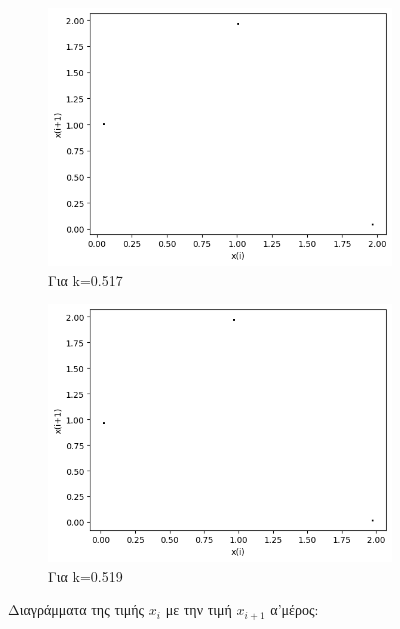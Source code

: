 \begin{figure}[h!]
\begin{subfigure}[b]{0.4\textwidth}
		\includegraphics[width=\textwidth]{LateX images/graphs/k0517}
		\caption{Για k=0.517}
	\end{subfigure}
	\hfill
	\begin{subfigure}[b]{0.4\textwidth}
		\centering
		\includegraphics[width=\textwidth]{LateX images/graphs/k0519}
		\caption{Για k=0.519}
		\label{f:k7}
	\end{subfigure}
	\hfill
\caption{Διαγράμματα της τιμής \(x_i\) με την τιμή \(x_{i+1}\) α'μέρος:}
\end{figure}

